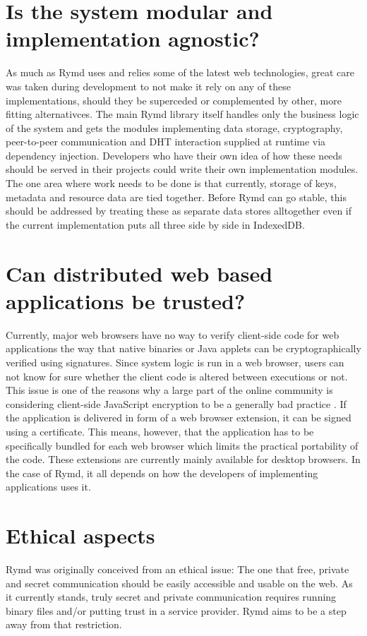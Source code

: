 \section{Is the system modular and implementation agnostic?}
As much as Rymd uses and relies some of the latest web technologies, great care was taken during development to not make it rely on any of these implementations, should they be superceded or complemented by other, more fitting alternativces. The main Rymd library itself handles only the business logic of the system and gets the modules implementing data storage, cryptography, peer-to-peer communication and DHT interaction supplied at runtime via dependency injection. Developers who have their own idea of how these needs should be served in their projects could write their own implementation modules. The one area where work needs to be done is that currently, storage of keys, metadata and resource data are tied together. Before Rymd can go stable, this should be addressed by treating these as separate data stores alltogether even if the current implementation puts all three side by side in IndexedDB.

\section{Can distributed web based applications be trusted?}
Currently, major web browsers have no way to verify client-side code for web applications the way that native binaries or Java applets can be cryptographically verified using signatures. Since system logic is run in a web browser, users can not know for sure whether the client code is altered between executions or not. This issue is one of the reasons why a large part of the online community is considering client-side JavaScript encryption to be a generally bad practice \cite{Matasano:Online}. If the application is delivered in form of a web browser extension, it can be signed using a certificate. This means, however, that the application has to be specifically bundled for each web browser which limits the practical portability of the code. These extensions are currently mainly available for desktop browsers. In the case of Rymd, it all depends on how the developers of implementing applications uses it.

\section{Ethical aspects}
Rymd was originally conceived from an ethical issue: The one that free, private and secret communication should be easily accessible and usable on the web. As it currently stands, truly secret and private communication requires running binary files and/or putting trust in a service provider. Rymd aims to be a step away from that restriction.

